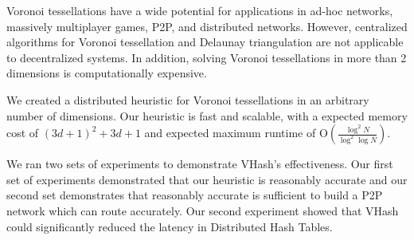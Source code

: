 Voronoi tessellations have a wide potential for applications in ad-hoc networks, massively multiplayer games, P2P, and distributed networks.
However, centralized algorithms for Voronoi tessellation and Delaunay triangulation are not applicable to decentralized systems.
In addition, solving Voronoi tessellations in more than 2 dimensions is computationally expensive.

We created a distributed heuristic for Voronoi tessellations in an arbitrary number of dimensions.
Our heuristic is fast and scalable, with a expected memory cost of $(3d+1)^{2}+3d+1$ and expected maximum runtime of O$(\frac{\log^{2} N}{\log^{2} \log N} )$.

We ran two sets of experiments to demonstrate VHash's effectiveness.
Our first set of experiments demonstrated that our heuristic is reasonably accurate  and our second set demonstrates that reasonably accurate is sufficient to build a P2P network which can route accurately.
Our second experiment showed that VHash  could significantly reduced the latency in Distributed Hash Tables.










